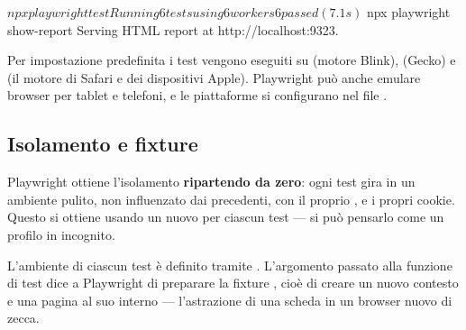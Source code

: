 \begin{affianco}[0.48][c]
\begin{console}[Terminale]
$ npx playwright test
Running 6 tests using 6 workers
  6 passed (7.1s)

$ npx playwright show-report
Serving HTML report at http://localhost:9323.
\end{console}
\risultato
\begin{immagine}[2 test $\times$ 3 browser = 6 esecuzioni.]
\end{immagine}
\end{affianco}

Per impostazione predefinita i test vengono eseguiti su  (motore
Blink),  (Gecko) e  (il motore di Safari e dei
dispositivi Apple). Playwright può anche emulare browser per tablet e telefoni,
e le piattaforme si configurano nel file .

\subsection{Isolamento e fixture}

Playwright ottiene l'isolamento \textbf{ripartendo da zero}: ogni test gira in un
ambiente pulito, non influenzato dai precedenti, con il proprio
,  e i propri cookie. Questo si ottiene
usando un nuovo  per ciascun test --- si può pensarlo come
un profilo in incognito.

L'ambiente di ciascun test è definito tramite . L'argomento
 passato alla funzione di test dice a Playwright di preparare la
fixture , cioè di creare un nuovo contesto e una pagina al suo
interno --- l'astrazione di una scheda in un browser nuovo di zecca.

